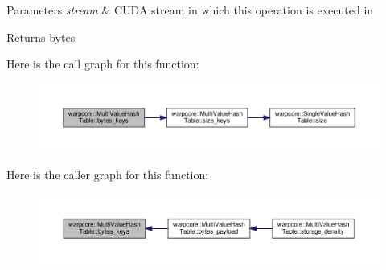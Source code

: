 \begin{DoxyParams}{Parameters}
{\em stream} & C\+U\+DA stream in which this operation is executed in \\
\hline
\end{DoxyParams}
\begin{DoxyReturn}{Returns}
bytes 
\end{DoxyReturn}
Here is the call graph for this function\+:
\nopagebreak
\begin{figure}[H]
\begin{center}
\leavevmode
\includegraphics[width=350pt]{classwarpcore_1_1MultiValueHashTable_a86f06bcb085fb809d8f40d3c044a078b_cgraph}
\end{center}
\end{figure}
Here is the caller graph for this function\+:
\nopagebreak
\begin{figure}[H]
\begin{center}
\leavevmode
\includegraphics[width=350pt]{classwarpcore_1_1MultiValueHashTable_a86f06bcb085fb809d8f40d3c044a078b_icgraph}
\end{center}
\end{figure}
\mbox{\label{classwarpcore_1_1MultiValueHashTable_a977baa47c1b37eeeb591dd13d76d184a}} 
